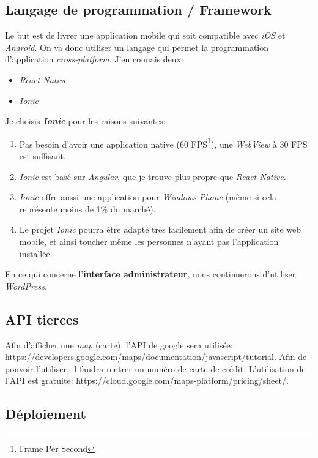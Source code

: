 \documentclass[french]{report}
\begin{document}
\subsection{Langage de programmation / Framework}
Le but est de livrer une application mobile qui soit compatible avec \textit{iOS}
et \textit{Android}. On va donc utiliser un langage qui permet la programmation
d'application \textit{cross-platform}. J'en connais deux:
\begin{itemize}
    \item \textit{React Native}
    \item \textit{Ionic}
\end{itemize}
Je choisis \textbf{\textit{Ionic}} pour les raisons suivantes:
\begin{enumerate}
    \item Pas besoin d'avoir une application native (60 FPS\footnote{Frame Per Second}),
    une \textit{WebView} à 30 FPS est suffisant.
    \item \textit{Ionic} est basé sur \textit{Angular}, que je trouve plus \og
    propre \fg{} que \textit{React Native}.
    \item \textit{Ionic} offre aussi une application pour \textit{Windows Phone} (même si
    cela représente moins de 1\% du marché).
    \item Le projet \textit{Ionic} pourra être adapté très facilement afin de créer
    un site web mobile, et ainsi toucher même les personnes n'ayant pas l'application
    installée.
\end{enumerate}
\vspace{1em}

En ce qui concerne l'\textbf{interface administrateur}, nous continuerons d'utiliser
\textit{WordPress}.


\subsection{API tierces}
Afin d'afficher une \textit{map} (carte), l'API de google sera utilisée:
\url{https://developers.google.com/maps/documentation/javascript/tutorial}. Afin de
pouvoir l'utiliser, il faudra rentrer un numéro de carte de crédit. L'utilisation
de l'API est gratuite: \url{https://cloud.google.com/maps-platform/pricing/sheet/}. 


\subsection{Déploiement}
\end{document}
